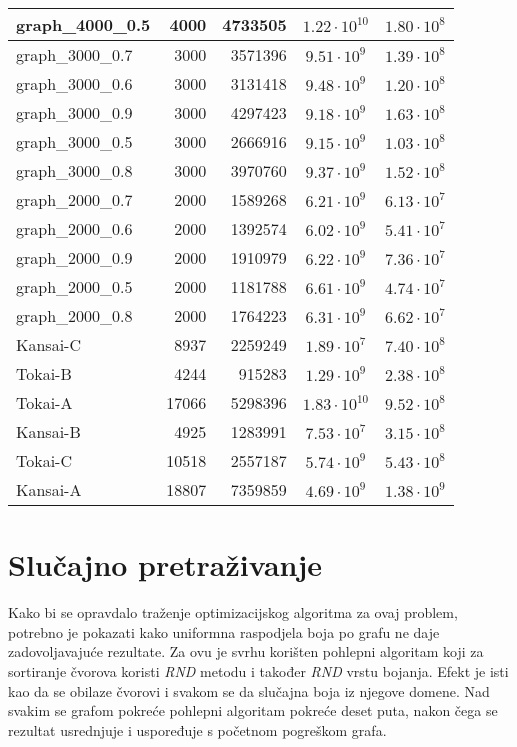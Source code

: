 \documentclass[times, utf8, diplomski, numeric]{fer}
\begin{document}
\begin{table}[htb]
\begin{tabular}{|l|r|r|c|c|}
		graph\_4000\_0.5 & 4000 & 4733505 & $1.22\cdot 10^{10}$ &$1.80\cdot 10^{8}$ \\ \hline 
		graph\_3000\_0.7 & 3000 & 3571396 & $9.51\cdot 10^{9}$ &$1.39\cdot 10^{8}$ \\ \hline 
		graph\_3000\_0.6 & 3000 & 3131418 & $9.48\cdot 10^{9}$ &$1.20\cdot 10^{8}$ \\ \hline 
		graph\_3000\_0.9 & 3000 & 4297423 & $9.18\cdot 10^{9}$ &$1.63\cdot 10^{8}$ \\ \hline 
		graph\_3000\_0.5 & 3000 & 2666916 & $9.15\cdot 10^{9}$ &$1.03\cdot 10^{8}$ \\ \hline 
		graph\_3000\_0.8 & 3000 & 3970760 & $9.37\cdot 10^{9}$ &$1.52\cdot 10^{8}$ \\ \hline 
		graph\_2000\_0.7 & 2000 & 1589268 & $6.21\cdot 10^{9}$ &$6.13\cdot 10^{7}$ \\ \hline 
		graph\_2000\_0.6 & 2000 & 1392574 & $6.02\cdot 10^{9}$ &$5.41\cdot 10^{7}$ \\ \hline 
		graph\_2000\_0.9 & 2000 & 1910979 & $6.22\cdot 10^{9}$ &$7.36\cdot 10^{7}$ \\ \hline 
		graph\_2000\_0.5 & 2000 & 1181788 & $6.61\cdot 10^{9}$ &$4.74\cdot 10^{7}$ \\ \hline 
		graph\_2000\_0.8 & 2000 & 1764223 & $6.31\cdot 10^{9}$ &$6.62\cdot 10^{7}$ \\ \hline 
		Kansai-C & 8937 & 2259249 & $1.89\cdot 10^{7}$ &$7.40\cdot 10^{8}$ \\ \hline 
		Tokai-B & 4244 & 915283 & $1.29\cdot 10^{9}$ &$2.38\cdot 10^{8}$ \\ \hline 
		Tokai-A & 17066 & 5298396 & $1.83\cdot 10^{10}$ &$9.52\cdot 10^{8}$ \\ \hline 
		Kansai-B & 4925 & 1283991 & $7.53\cdot 10^{7}$ &$3.15\cdot 10^{8}$ \\ \hline 
		Tokai-C & 10518 & 2557187 & $5.74\cdot 10^{9}$ &$5.43\cdot 10^{8}$ \\ \hline 
		Kansai-A & 18807 & 7359859 & $4.69\cdot 10^{9}$ &$1.38\cdot 10^{9}$ \\ \hline 
	\end{tabular}
\end{table}

\section{Slučajno pretraživanje}

Kako bi se opravdalo traženje optimizacijskog algoritma za ovaj problem, potrebno je pokazati kako uniformna raspodjela boja po grafu ne daje zadovoljavajuće rezultate. Za ovu je svrhu korišten pohlepni algoritam koji za sortiranje čvorova koristi \emph{RND} metodu i također \emph{RND} vrstu bojanja. Efekt je isti kao da se obilaze čvorovi i svakom se da slučajna boja iz njegove domene. Nad svakim se grafom pokreće pohlepni algoritam pokreće deset puta, nakon čega se rezultat usrednjuje i uspoređuje s početnom pogreškom grafa.
\end{document}
